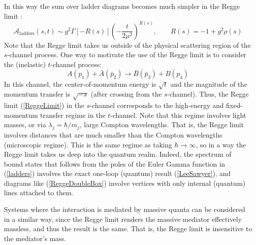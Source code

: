 In this way the sum over ladder diagrams becomes much simpler in the Regge limit \cite{LeeSawyer}:
\begin{equation}
	\mathcal{A}_{\text{ladders}}(s, t) \sim g^{2} \Gamma[-R(s)] \left(- \frac{t}{2 \mu^{2}} \right)^{R(s)}, \qquad R(s) = -1 + g^{2} \rho(s) \label{ladders}
\end{equation}
Note that the Regge limit takes us outside of the physical scattering region of the $s$-channel process. One way to motivate the use of the Regge limit is to consider the (inelastic) $t$-channel process:
\begin{equation}
	A(p_{1}) + \bar{A}(\bar{p}_{2}) \longrightarrow \bar{B}(\bar{p}_{3}) + B(p_{4})
\end{equation}
In this channel, the center-of-momentum energy is $\sqrt{t}$ and the magnitude of the momentum transfer is $\sqrt{-s}$ (after crossing from the $s$-channel). Thus, the Regge limit (\ref{ReggeLimit}) in the $s$-channel corresponds to the high-energy and fixed-momentum transfer regime in the $t$-channel. Note that this regime involves light masses, or via $\lambda_{j} = \hbar / m_{j}$, large Compton wavelengths. That is, the Regge limit involves distances that are much smaller than the Compton wavelengths (microscopic regime). This is the same regime as taking $\hbar \rightarrow \infty$, so in a way the Regge limit takes us deep into the quantum realm. Indeed, the spectrum of bound states that follows from the poles of the Euler Gamma function in (\ref{ladders}) involves the exact one-loop (quantum) result (\ref{LeeSawyer}), and diagrams like (\ref{ReggeDoubleBox}) involve vertices with only internal (quantum) lines attached to them.

Systems where the interaction is mediated by massive quanta can be considered in a similar way, since the Regge limit renders the massive mediator effectively massless, and thus the result is the same. That is, the Regge limit is insensitive to the mediator's mass.
